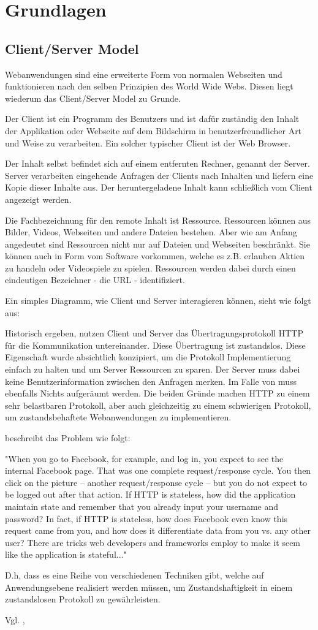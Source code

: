 \chapter{Grundlagen}

\section{Client/Server Model}

Webanwendungen sind eine erweiterte Form von normalen Webseiten und funktionieren nach den selben Prinzipien des World Wide Webs. Diesen liegt wiederum das Client/Server Model zu Grunde.

Der Client ist ein Programm des Benutzers und ist dafür zuständig den Inhalt der Applikation oder Webseite auf dem Bildschirm in benutzerfreundlicher Art und Weise zu verarbeiten. Ein solcher typischer Client ist der Web Browser.

Der Inhalt selbst befindet sich auf einem entfernten Rechner, genannt der Server. Server verarbeiten eingehende Anfragen der Clients nach Inhalten und liefern eine Kopie dieser Inhalte aus.
Der heruntergeladene Inhalt kann schließlich vom Client angezeigt werden.

Die Fachbezeichnung für den remote Inhalt ist Ressource. Ressourcen können aus Bilder, Videos, Webseiten und andere Dateien bestehen. Aber wie am Anfang angedeutet sind Ressourcen nicht nur auf Dateien und Webseiten beschränkt. Sie können auch in Form vom Software vorkommen, welche es z.B. erlauben
Aktien zu handeln oder Videospiele zu spielen. Ressourcen werden dabei durch einen eindeutigen Bezeichner - die URL - identifiziert.

Ein simples Diagramm, wie Client und Server interagieren können, sieht wie folgt aus:

Historisch ergeben, nutzen Client und Server das Übertragungsprotokoll HTTP für die Kommunikation untereinander. Diese Übertragung ist zustandslos. Diese Eigenschaft wurde absichtlich konzipiert, um die Protokoll Implementierung einfach zu halten und um Server Ressourcen zu sparen. Der Server muss dabei keine Benutzerinformation zwischen den Anfragen merken. Im Falle von muss ebenfalls Nichts aufgeräumt werden. Die beiden Gründe machen HTTP zu einem sehr belastbaren Protokoll, aber auch gleichzeitig zu einem schwierigen Protokoll, um zustandsbehaftete Webanwendungen zu implementieren.

\citep[Background]{launchschool} beschreibt das Problem wie folgt:

"When you go to Facebook, for example, and log in, you expect to see the internal Facebook page. That was one complete request/response cycle. You then click on the picture -- another request/response cycle -- but you do not expect to be logged out after that action. If HTTP is stateless, how did the application maintain state and remember that you already input your username and password? In fact, if HTTP is stateless, how does Facebook even know this request came from you, and how does it differentiate data from you vs. any other user? There are tricks web developers and frameworks employ to make it seem like the application is stateful..."

D.h, dass es eine Reihe von verschiedenen Techniken gibt, welche auf Anwendungsebene realisiert werden müssen, um Zustandshaftigkeit in einem zustandslosen Protokoll zu gewährleisten.

Vgl. \citep[Background]{launchschool}, \citep{culloca}
